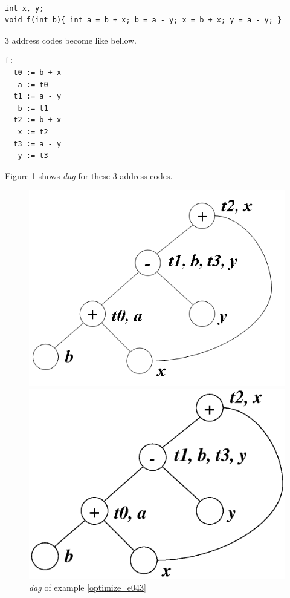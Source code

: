 \begin{Example}
\label{optimize_e043}
\begin{verbatim}

int x, y;
void f(int b){ int a = b + x; b = a - y; x = b + x; y = a - y; }
\end{verbatim}
3 address codes become like bellow.
\begin{verbatim}
f:
  t0 := b + x
   a := t0
  t1 := a - y
   b := t1
  t2 := b + x
   x := t2
  t3 := a - y
   y := t3
\end{verbatim}
Figure \ref{optimize_e044} shows {\em dag} for these 3 address codes.
\begin{figure}[htbp]
\begin{center}
\begin{htmlonly}
\includegraphics[width=0.7\linewidth,height=0.540\linewidth]{opt023.png}
\end{htmlonly}
\begin{latexonly}
\includegraphics[width=0.7\linewidth,height=0.540\linewidth]{opt023.eps}
\end{latexonly}
\caption{{\em dag} of example \ref{optimize_e043}}
\label{optimize_e044}
\end{center}

\end{figure}
\end{Example}
